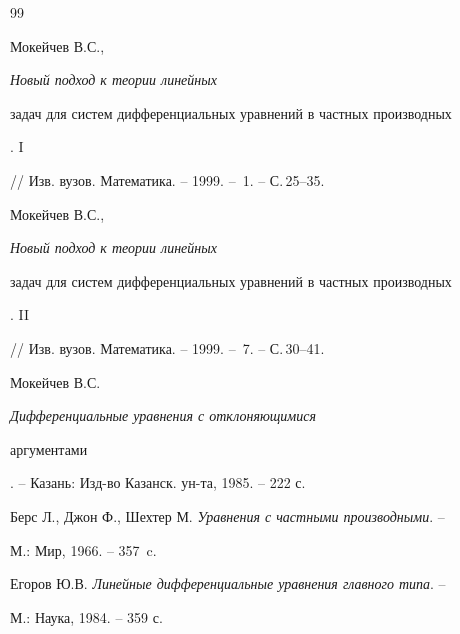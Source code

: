 \begin{thebibliography}{99} 


 




Мокейчев В.С.,  {\em Новый подход к теории линейных 


задач для систем дифференциальных уравнений в частных производных}. I 


// Изв. вузов. Математика. -- 1999. -- \No\,1. -- С.\,25--35. 




Мокейчев В.С.,  {\em Новый подход к теории линейных 


задач для систем дифференциальных уравнений в частных производных}. II


// Изв. вузов. Математика. -- 1999. -- \No\,7. -- С.\,30--41. 




Мокейчев В.С. {\em Дифференциальные уравнения с отклоняющимися 


аргументами}. -- Казань: Изд-во Казанск. ун-та, 1985. -- 222 с. 




Берс Л., Джон Ф., Шехтер М. {\em Уравнения с частными производными}. -- 


М.: Мир, 1966. -- 357~c. 




Егоров Ю.В. {\em Линейные дифференциальные уравнения главного типа}. -- 


М.: Наука, 1984. -- 359 с. 


 


\end{thebibliography} 


 


\vskip 1cm 


 






 


\label{end} 


 


 


